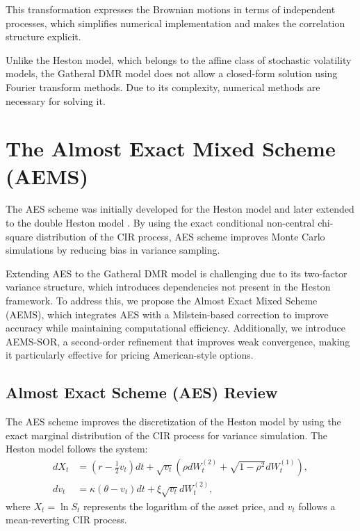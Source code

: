 \documentclass[graybox]{svmult}
\begin{document}
This transformation expresses the Brownian motions in terms of independent processes, which simplifies numerical implementation and makes the correlation structure explicit.

Unlike the Heston model, which belongs to the affine class of stochastic volatility models, the Gatheral DMR model does not allow a closed-form solution using Fourier transform methods. Due to its complexity, numerical methods are necessary for solving it.


\section{The Almost Exact Mixed Scheme (AEMS)}

The AES scheme was initially developed for the Heston model \cite{oosterlee2019mathematical} and later extended to the double Heston model \cite{kalicanin2022bermudan}. By using the exact conditional non-central chi-square distribution of the CIR process, AES scheme improves Monte Carlo simulations by reducing bias in variance sampling.

Extending AES to the Gatheral DMR model is challenging due to its two-factor variance structure, which introduces dependencies not present in the Heston framework. To address this, we propose the Almost Exact Mixed Scheme (AEMS), which integrates AES with a Milstein-based correction to improve accuracy while maintaining computational efficiency. Additionally, we introduce AEMS-SOR, a second-order refinement that improves weak convergence, making it particularly effective for pricing American-style options.


\subsection{Almost Exact Scheme (AES) Review}

The AES scheme improves the discretization of the Heston model by using the exact marginal distribution of the CIR process for variance simulation. The Heston model follows the system:
\begin{align*}
    dX_t &= \left( r - \frac{1}{2} v_t \right) dt + \sqrt{v_t} \left( \rho dW_t^{(2)} + \sqrt{1 - \rho^2} dW_t^{(1)} \right), \\
    dv_t &= \kappa (\theta - v_t) dt + \xi \sqrt{v_t} dW_t^{(2)},
\end{align*}
where $X_t = \ln S_t$ represents the logarithm of the asset price, and $v_t$ follows a mean-reverting CIR process.
\end{document}
